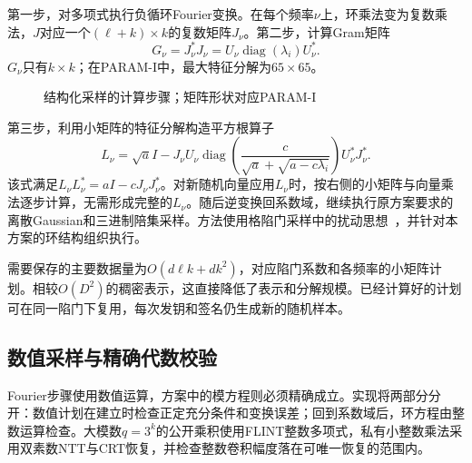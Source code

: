 第一步，对多项式执行负循环Fourier变换。在每个频率$\nu$上，环乘法变为复数乘法，$J$对应一个$(\ell+k)\times k$的复数矩阵$J_\nu$。第二步，计算Gram矩阵
\[
 G_\nu=J_\nu^*J_\nu
      =U_\nu\operatorname{diag}(\lambda_i)U_\nu^*.
\]
$G_\nu$只有$k\times k$；在PARAM-I中，最大特征分解为$65\times65$。

\begin{figure}[H]
\centering
{}
\caption{结构化采样的计算步骤；矩阵形状对应PARAM-I}
\label{fig:ring-sampler}
\end{figure}

第三步，利用小矩阵的特征分解构造平方根算子
\[
 L_\nu=\sqrt a I-
 J_\nu U_\nu\operatorname{diag}\!\left(
 \frac{c}{\sqrt a+\sqrt{a-c\lambda_i}}
 \right)U_\nu^*J_\nu^*.
\]
该式满足$L_\nu L_\nu^*=aI-cJ_\nu J_\nu^*$。对新随机向量应用$L_\nu$时，按右侧的小矩阵与向量乘法逐步计算，无需形成完整的$L_\nu$。随后逆变换回系数域，继续执行原方案要求的离散Gaussian和三进制陪集采样。方法使用格陷门采样中的扰动思想~\cite{micciancio2012trapdoors}，并针对本方案的环结构组织执行。

需要保存的主要数据量为$O(d\ell k+dk^2)$，对应陷门系数和各频率的小矩阵计划。相较$O(D^2)$的稠密表示，这直接降低了表示和分解规模。已经计算好的计划可在同一陷门下复用，每次发钥和签名仍生成新的随机样本。

\subsection{数值采样与精确代数校验}
Fourier步骤使用数值运算，方案中的模方程则必须精确成立。实现将两部分分开：数值计划在建立时检查正定充分条件和变换误差；回到系数域后，环方程由整数运算检查。大模数$q=3^k$的公开乘积使用FLINT整数多项式，私有小整数乘法采用双素数NTT与CRT恢复，并检查整数卷积幅度落在可唯一恢复的范围内。

